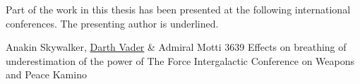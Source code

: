 %
%
%


%
\begin{conferences}
	Part of the work in this thesis has been presented at the following 
	international conferences. The presenting author is underlined.

  \conferenceitem%
    {Anakin Skywalker, \underline{Darth Vader} \& Admiral Motti}%
    {3639}%
    {Effects on breathing of underestimation of the power of The Force}%
    {Intergalactic Conference on Weapons and Peace}%
    {Kamino}%

\end{conferences}


%
\tableofcontents
